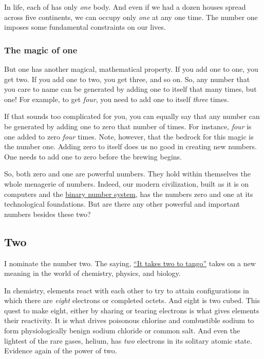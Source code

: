 \documentclass[
  a4paper,
]{article}
\begin{document}
In life, each of has only \emph{one} body. And even if we had a dozen
houses spread across five continents, we can occupy only \emph{one} at
any one time. The number one imposes some fundamental constraints on our
lives.

\hypertarget{the-magic-of-one}{%
\subsubsection{The magic of one}\label{the-magic-of-one}}

But one has another magical, mathematical property. If you add one to
one, you get two. If you add one to two, you get three, and so on. So,
any number that you care to name can be generated by adding one to
itself that many times, but one! For example, to get \emph{four}, you
need to add one to itself \emph{three} times.

If that sounds too complicated for you, you can equally say that any
number can be generated by adding one to zero that number of times. For
instance, \emph{four} is one added to zero \emph{four} times. Note,
however, that the bedrock for this magic is the number one. Adding zero
to itself does us no good in creating new numbers. One needs to add one
to zero before the brewing begins.

So, both zero and one are powerful numbers. They hold within themselves
the whole menagerie of numbers. Indeed, our modern civilization, built
as it is on computers and the
\href{https://www.britannica.com/science/binary-number-system}{binary
number system}, has the numbers zero and one at its technological
foundations. But are there any other powerful and important numbers
besides these two?

\hypertarget{two}{%
\subsection{Two}\label{two}}

I nominate the number two. The saying,
\href{https://dictionary.cambridge.org/dictionary/english/it-takes-two-to-tango}{``It
takes two to tango''} takes on a new meaning in the world of chemistry,
physics, and biology.

In chemistry, elements react with each other to try to attain
configurations in which there are \emph{eight} electrons or completed
octets. And eight is two cubed. This quest to make eight, either by
sharing or tearing electrons is what gives elements their reactivity. It
is what drives poisonous chlorine and combustible sodium to form
physiologically benign sodium chloride or common salt. And even the
lightest of the rare gases, helium, has \emph{two} electrons in its
solitary atomic state. Evidence again of the power of two.
\end{document}
